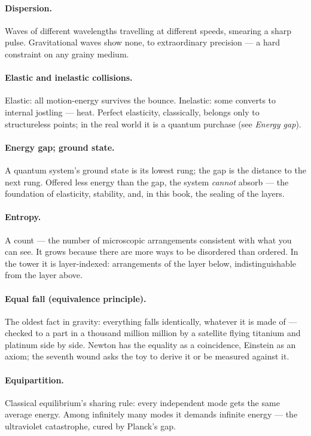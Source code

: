 \documentclass[fontsize=11pt,paper=a4,pagesize=auto,parskip=half-]{scrbook}
\begin{document}
\paragraph{Dispersion.} Waves of different wavelengths travelling at different speeds, smearing a sharp pulse. Gravitational waves show none, to extraordinary precision --- a hard constraint on any grainy medium.

\paragraph{Elastic and inelastic collisions.} Elastic: all motion-energy survives the bounce. Inelastic: some converts to internal jostling --- heat. Perfect elasticity, classically, belongs only to structureless points; in the real world it is a quantum purchase (see \emph{Energy gap}).

\paragraph{Energy gap; ground state.} A quantum system's ground state is its lowest rung; the gap is the distance to the next rung. Offered less energy than the gap, the system \emph{cannot} absorb --- the foundation of elasticity, stability, and, in this book, the sealing of the layers.

\paragraph{Entropy.} A count --- the number of microscopic arrangements consistent with what you can see. It grows because there are more ways to be disordered than ordered. In the tower it is layer-indexed: arrangements of the layer below, indistinguishable from the layer above.

\paragraph{Equal fall (equivalence principle).} The oldest fact in gravity: everything falls identically, whatever it is made of --- checked to a part in a thousand million million by a satellite flying titanium and platinum side by side. Newton has the equality as a coincidence, Einstein as an axiom; the seventh wound asks the toy to derive it or be measured against it.

\paragraph{Equipartition.} Classical equilibrium's sharing rule: every independent mode gets the same average energy. Among infinitely many modes it demands infinite energy --- the ultraviolet catastrophe, cured by Planck's gap.
\end{document}
